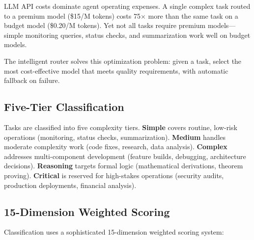 \documentclass[conference]{IEEEtran}
\begin{document}
LLM API costs dominate agent operating expenses. A single complex task routed to a premium model (\$15/M tokens) costs 75$\times$ more than the same task on a budget model (\$0.20/M tokens). Yet not all tasks require premium models—simple monitoring queries, status checks, and summarization work well on budget models.

The intelligent router solves this optimization problem: given a task, select the most cost-effective model that meets quality requirements, with automatic fallback on failure.

\subsection{Five-Tier Classification}

Tasks are classified into five complexity tiers. \textbf{Simple} covers routine, low-risk operations (monitoring, status checks, summarization). \textbf{Medium} handles moderate complexity work (code fixes, research, data analysis). \textbf{Complex} addresses multi-component development (feature builds, debugging, architecture decisions). \textbf{Reasoning} targets formal logic (mathematical derivations, theorem proving). \textbf{Critical} is reserved for high-stakes operations (security audits, production deployments, financial analysis).

\subsection{15-Dimension Weighted Scoring}

Classification uses a sophisticated 15-dimension weighted scoring system:
\end{document}
